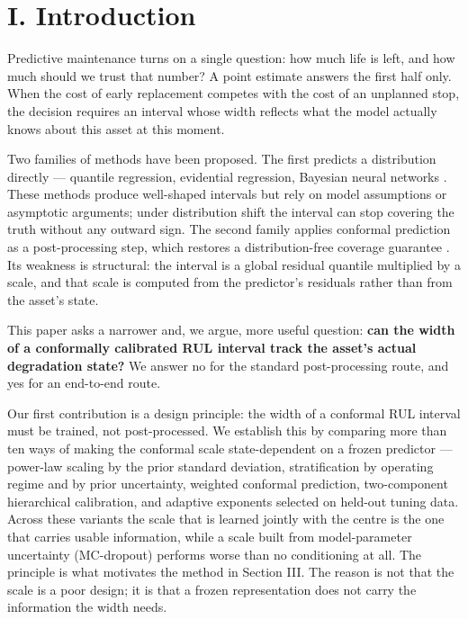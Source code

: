 ﻿\documentclass[journal]{IEEEtran}
\begin{document}
\section{I. Introduction}\label{i.-introduction}

Predictive maintenance turns on a single question: how much life is left, and how much should we trust that number? A point estimate answers the first half only. When the cost of early replacement competes with the cost of an unplanned stop, the decision requires an interval whose width reflects what the model actually knows about this asset at this moment.

Two families of methods have been proposed. The first predicts a distribution directly --- quantile regression, evidential regression, Bayesian neural networks \citep{frizzo2025, ly2025, hou2025, barry2026}. These methods produce well-shaped intervals but rely on model assumptions or asymptotic arguments; under distribution shift the interval can stop covering the truth without any outward sign. The second family applies conformal prediction as a post-processing step, which restores a distribution-free coverage guarantee \citep{barber2023, romano2019}. Its weakness is structural: the interval is a global residual quantile multiplied by a scale, and that scale is computed from the predictor's residuals rather than from the asset's state.

This paper asks a narrower and, we argue, more useful question: \textbf{can the width of a conformally calibrated RUL interval track the asset's actual degradation state?} We answer no for the standard post-processing route, and yes for an end-to-end route.

Our first contribution is a design principle: the width of a conformal RUL interval must be trained, not post-processed. We establish this by comparing more than ten ways of making the conformal scale state-dependent on a frozen predictor --- power-law scaling by the prior standard deviation, stratification by operating regime and by prior uncertainty, weighted conformal prediction, two-component hierarchical calibration, and adaptive exponents selected on held-out tuning data. Across these variants the scale that is learned jointly with the centre is the one that carries usable information, while a scale built from model-parameter uncertainty (MC-dropout) performs worse than no conditioning at all. The principle is what motivates the method in Section III. The reason is not that the scale is a poor design; it is that a frozen representation does not carry the information the width needs.
\end{document}
